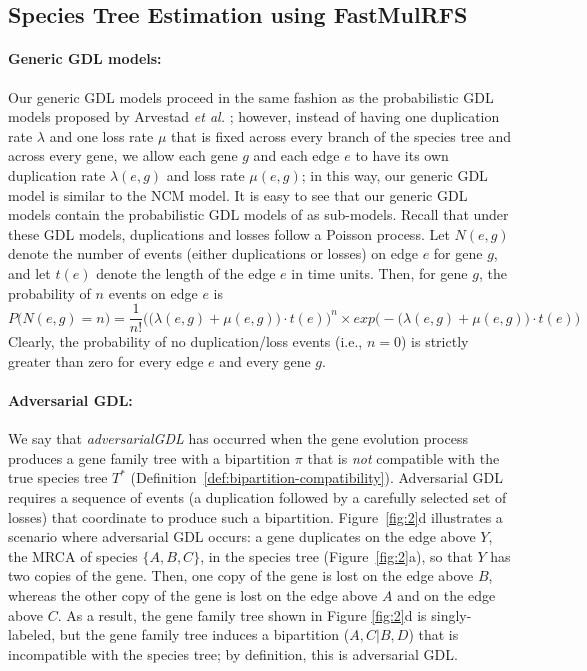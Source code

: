 \subsection{Species Tree Estimation using FastMulRFS}
\label{sec:fastmulrfs}
\paragraph{Generic GDL models:}
Our generic GDL models proceed in the same fashion as the probabilistic \gls{GDL} models proposed by Arvestad {\em et al.} \cite{arvestad2009gene}; however, instead of having one duplication rate $\lambda$ and one loss rate $\mu$ that is fixed across every branch of the species tree and across every gene, we allow each gene $g$ and each edge $e$ to have its own duplication rate $\lambda(e,g)$ and loss rate $\mu(e,g)$; in this way, our generic GDL model is similar to the NCM model.
It is easy to see that our generic GDL models contain the probabilistic GDL models of \cite{arvestad2009gene} as sub-models.
Recall that under these GDL models, duplications and losses follow a Poisson process. 
Let $N(e, g)$ denote the number of events (either duplications or losses) on edge $e$ for gene $g$, and let $t(e)$ denote the length of the edge $e$ in time units.
Then, for gene $g$, the probability of $n$ events on edge $e$ is
\begin{equation}
	P\big(N(e,g) = n\big) = 
	\frac{1}{n!} \bigg( \big( \lambda(e,g) + \mu(e,g) \big) \cdot t(e) \bigg)^n 
	\times exp\bigg(-\big(\lambda(e,g) + \mu(e,g) \big) \cdot t(e) \bigg)
\end{equation}
Clearly, the probability of no duplication/loss events (i.e., $n=0$) is strictly greater than zero for every edge $e$ and every gene $g$.

\paragraph{Adversarial GDL:}
We say that \textit{\gls{adversarialGDL}} has occurred when the gene evolution process produces a gene family tree with a bipartition $\pi$ that is {\em not} \gls{compatible} with the true species tree $T^*$ (Definition~\ref{def:bipartition-compatibility}).
Adversarial GDL requires a sequence of events (a duplication followed by a carefully selected set of losses) that coordinate to produce such a bipartition.
Figure~\ref{fig:2}d illustrates a scenario where adversarial GDL occurs: a gene duplicates on the edge above $Y$, the \gls{MRCA} of species $\{A, B, C\}$, in the species tree (Figure~\ref{fig:2}a), so that $Y$ has two copies of the gene.
Then, one copy of the gene is lost on the edge above $B$, whereas the other copy of the gene is lost on the edge above $A$ and on the edge above $C$.
As a result, the gene family tree shown in Figure \ref{fig:2}d is singly-labeled, but the gene family tree induces a bipartition ($A,C|B,D$) that is incompatible with the species tree; by definition, this is adversarial GDL.

